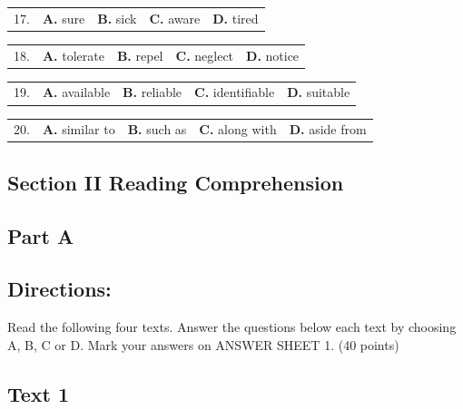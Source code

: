 \documentclass[UTF8,11pt]{ctexart}
\begin{document}
\noindent\begin{tabularx}{\linewidth}{@{}lXXXX@{}}17. & \textbf{A.} sure & \textbf{B.} sick & \textbf{C.} aware & \textbf{D.} tired\\\end{tabularx}\par

\noindent\begin{tabularx}{\linewidth}{@{}lXXXX@{}}18. & \textbf{A.} tolerate & \textbf{B.} repel & \textbf{C.} neglect & \textbf{D.} notice\\\end{tabularx}\par

\noindent\begin{tabularx}{\linewidth}{@{}lXXXX@{}}19. & \textbf{A.} available & \textbf{B.} reliable & \textbf{C.} identifiable & \textbf{D.} suitable\\\end{tabularx}\par

\noindent\begin{tabularx}{\linewidth}{@{}lXXXX@{}}20. & \textbf{A.} similar to & \textbf{B.} such as & \textbf{C.} along with & \textbf{D.} aside from\\\end{tabularx}\par

\subsection*{\textbf{Section II Reading Comprehension}}


\subsection*{\textbf{Part A}}


\subsection*{\textbf{Directions:}}


Read the following four texts. Answer the questions below each text by choosing A, B, C or D. Mark your answers on ANSWER SHEET 1. (40 points)


\subsection*{\textbf{Text 1}}
\end{document}
